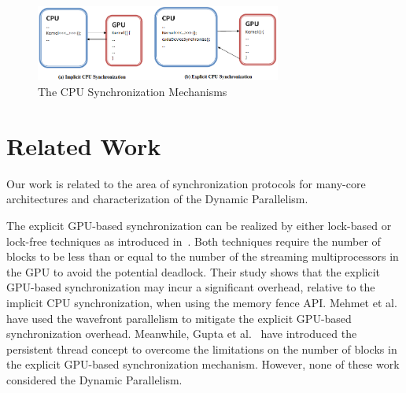 \documentclass[conference]{IEEEtran}
\begin{document}

\begin{figure}
	\includegraphics[width=1.0\columnwidth, height=2.5cm]{cpu_sync.png}
	\caption{The CPU Synchronization Mechanisms}
	\label{fig:cpu_sync}
\end{figure}

\section{Related Work}
\label{sec:RW}
Our work is related to the area of synchronization protocols for many-core architectures and characterization of the Dynamic Parallelism. 

The explicit GPU-based synchronization can be realized by either lock-based or lock-free techniques as introduced in~\cite{proc9}. Both techniques require the number of blocks to be less than or equal to the number of the streaming multiprocessors in the GPU to avoid the potential deadlock. Their study shows that the explicit GPU-based synchronization may incur a significant overhead, relative to the implicit CPU synchronization, when using the memory fence API.  Mehmet et al.~\cite{proc10} have used the wavefront parallelism to mitigate the explicit GPU-based synchronization overhead. Meanwhile, Gupta et al.~\cite{proc13} have introduced the persistent thread concept to overcome the limitations on the number of blocks in the explicit GPU-based synchronization mechanism. However, none of these work considered the Dynamic Parallelism.
\end{document}

